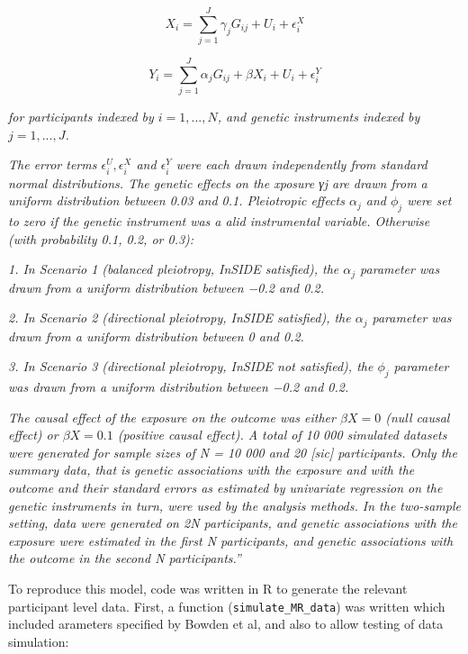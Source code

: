 \documentclass[
]{article}
\begin{document}
\begin{equation}
 X_i = \sum^J_{j=1} \gamma_jG_{ij} + U_i + \epsilon_i^X
 \end{equation}

\begin{equation}
 Y_i = \sum^J_{j=1} \alpha_jG_{ij} + \beta X_i + U_i + \epsilon_i^Y
 \end{equation}

\emph{for participants indexed by \(i = 1, . . . , N\), and genetic instruments indexed by \(j = 1, . . . , J\).}

\emph{The error terms \(\epsilon_i^U , \epsilon_i^X\) and \(\epsilon_i^Y\) were each drawn independently from standard normal distributions. The genetic effects on the xposure γj are drawn from a uniform distribution between 0.03 and 0.1. Pleiotropic effects \(\alpha_j\) and \(\phi_j\) were set to zero if the genetic instrument was a alid instrumental variable. Otherwise (with probability 0.1, 0.2, or 0.3):}

\emph{1. In Scenario 1 (balanced pleiotropy, InSIDE satisfied), the \(\alpha_j\) parameter was drawn from a uniform distribution between −0.2 and 0.2.}

\emph{2. In Scenario 2 (directional pleiotropy, InSIDE satisfied), the \(\alpha_j\) parameter was drawn from a uniform distribution between 0 and 0.2.}

\emph{3. In Scenario 3 (directional pleiotropy, InSIDE not satisfied), the \(\phi_j\) parameter was drawn from a uniform distribution between −0.2 and 0.2.}

\emph{The causal effect of the exposure on the outcome was either \(\beta X = 0\) (null causal effect) or \(\beta X = 0.1\) (positive causal effect). A total of 10 000 simulated datasets were generated for sample sizes of N = 10 000 and 20 {[}sic{]} participants. Only the summary data, that is genetic associations with the exposure and with the outcome and their standard errors as estimated by univariate regression on the genetic instruments in turn, were used by the analysis methods. In the two-sample setting, data were generated on 2N participants, and genetic associations with the exposure were estimated in the first N participants, and genetic associations with the outcome in the second N participants.''} \citep{bowden_consistent_2016}

To reproduce this model, code was written in R to generate the relevant participant level data. First, a function (\texttt{simulate\_MR\_data}) was written which included arameters specified by Bowden et al, and also to allow testing of data simulation:
\end{document}
